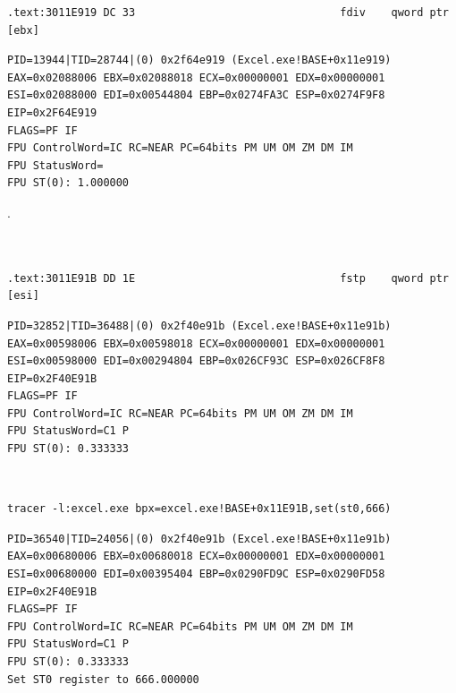 \begin{lstlisting}
.text:3011E919 DC 33                                fdiv    qword ptr [ebx]
\end{lstlisting}

\begin{lstlisting}
PID=13944|TID=28744|(0) 0x2f64e919 (Excel.exe!BASE+0x11e919)
EAX=0x02088006 EBX=0x02088018 ECX=0x00000001 EDX=0x00000001
ESI=0x02088000 EDI=0x00544804 EBP=0x0274FA3C ESP=0x0274F9F8
EIP=0x2F64E919
FLAGS=PF IF
FPU ControlWord=IC RC=NEAR PC=64bits PM UM OM ZM DM IM 
FPU StatusWord=
FPU ST(0): 1.000000
\end{lstlisting}

 \TT{[EBX]}.\\
\\
\\

\begin{lstlisting}
.text:3011E91B DD 1E                                fstp    qword ptr [esi]
\end{lstlisting}


\begin{lstlisting}
PID=32852|TID=36488|(0) 0x2f40e91b (Excel.exe!BASE+0x11e91b)
EAX=0x00598006 EBX=0x00598018 ECX=0x00000001 EDX=0x00000001
ESI=0x00598000 EDI=0x00294804 EBP=0x026CF93C ESP=0x026CF8F8
EIP=0x2F40E91B
FLAGS=PF IF
FPU ControlWord=IC RC=NEAR PC=64bits PM UM OM ZM DM IM 
FPU StatusWord=C1 P 
FPU ST(0): 0.333333
\end{lstlisting}

\\

\begin{lstlisting}
tracer -l:excel.exe bpx=excel.exe!BASE+0x11E91B,set(st0,666)
\end{lstlisting}

\begin{lstlisting}
PID=36540|TID=24056|(0) 0x2f40e91b (Excel.exe!BASE+0x11e91b)
EAX=0x00680006 EBX=0x00680018 ECX=0x00000001 EDX=0x00000001
ESI=0x00680000 EDI=0x00395404 EBP=0x0290FD9C ESP=0x0290FD58
EIP=0x2F40E91B
FLAGS=PF IF
FPU ControlWord=IC RC=NEAR PC=64bits PM UM OM ZM DM IM 
FPU StatusWord=C1 P 
FPU ST(0): 0.333333
Set ST0 register to 666.000000
\end{lstlisting}

